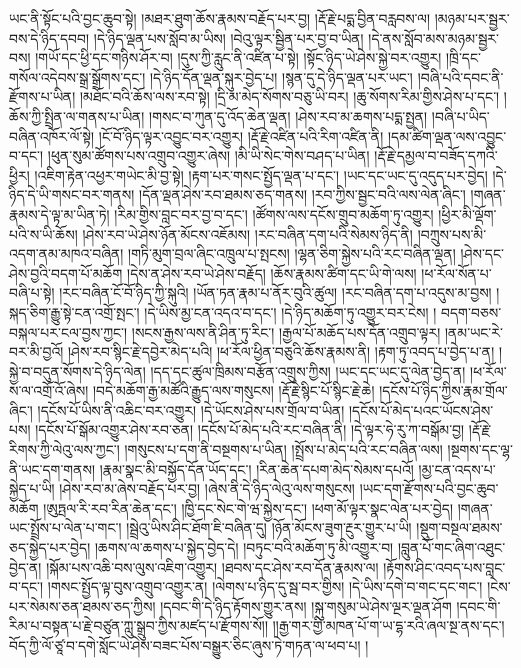 ཡང་ནི་སྟོང་པའི་བྱང་ཆུབ་སྟེ། །མཐར་ཐུག་ཆོས་རྣམས་བརྗོད་པར་བྱ། །རྡོ་རྗེ་པདྨ་བྱིན་བརླབས་ལ། །མཉམ་པར་སྦྱར་བས་དེ་ཉིད་དབབ། །དེ་ཉིད་ལྡན་པས་སློབ་མ་ཡིས། །བེའུ་ལྟར་སྦྱིན་པར་བྱ་བ་ཡིན། །དེ་ནས་སློབ་མས་མཉམ་སྦྱར་བས། །གཡོ་དང་ཕྱི་དང་གཉིས་ཤོར་བ། །དུས་ཀྱི་རླུང་ནི་འཛིན་པ་སྟེ། །སྟོང་ཉིད་ཡེ་ཤེས་སྐྱེ་བར་འགྱུར། །ཁྲི་དང་གསོལ་འདེབས་སྒྲ་སྒྲོགས་དང་། །དེ་ཉིད་དོན་ལྡན་སྐུར་བྱེད་པ། །སྙན་དུ་དེ་ཉིད་ལྡན་པར་ཡང་། །བཞི་པའི་དབང་ནི་རྫོགས་པ་ཡིན། །མཐོང་བའི་ཆོས་ལས་རབ་སྟེ། །དྲི་མ་མེད་སོགས་བཅུ་ཡི་བར། །ཆུ་སོགས་རིམ་གྱིས་ཤེས་པ་དང་། །ཆོས་ཀྱི་སྤྲིན་ལ་གནས་པ་ཡིན། །གསང་བ་ཀུན་དུ་འོད་ཆེན་ལྡན། །ཤེས་རབ་མ་ཆགས་པདྨ་སྤྱན། །བཞི་པ་ཡིད་བཞིན་འཁོར་ལོ་སྟེ། །ངོ་བོ་ཉིད་ལྟར་འབྱུང་བར་འགྱུར། །རྡོ་རྗེ་འཛིན་པའི་རིག་འཛིན་ནི། །དམ་ཚིག་ལྡན་ལས་འབྱུང་བ་དང་། །ཕུན་སུམ་ཚོགས་པས་འགྲུབ་འགྱུར་ཞེས། །མི་ཡི་སེང་གེས་བཤད་པ་ཡིན། །རྡོ་རྗེ་དམྱལ་བ་བཟོད་དཀའི་ཕྱིར། །འཇིག་རྟེན་འཕྱར་གཡེང་མི་བྱ་སྟེ། །རྟག་པར་གསང་སྤྱོད་ལྡན་པ་དང་། །ཡང་དང་ཡང་དུ་འདུད་པར་བྱེད། །དེ་ཉིད་དེ་ཡི་གསང་བར་གནས། །དོན་ལྡན་ཤེས་རབ་ཐམས་ཅད་གནས། །རབ་ཀྱིས་སྦྱང་བའི་ལས་ལེན་ཞིང་། །གཞན་རྣམས་དེ་ལྟ་མ་ཡིན་ཏེ། །རིམ་གྱིས་བླང་བར་བྱ་བ་དང་། །ཚོགས་ལས་དངོས་གྲུབ་མཆོག་ཏུ་འགྱུར། །ཕྱིར་མི་ལྡོག་པའི་ས་ཡི་ཆོས། །ཤེས་རབ་ཡེ་ཤེས་ཉོན་མོངས་འཇོམས། །རང་བཞིན་དག་པའི་སེམས་ཉིད་ནི། །བཀྲུས་པས་མི་འདག་ནམ་མཁའ་བཞིན། །གཏི་མུག་བྲལ་ཞིང་འཁྲུལ་པ་སྤངས། །ལྷན་ཅིག་སྐྱེས་པའི་རང་བཞིན་ལྡན། །ཤེས་དང་ཤེས་བྱའི་བདག་པོ་མཆོག །དེས་ན་ཤེས་རབ་ཡེ་ཤེས་བརྗོད། །ཆོས་རྣམས་ཚིག་དང་ཡི་གེ་ལས། །ཕ་རོལ་སོན་པ་བཞི་པ་སྟེ། །རང་བཞིན་ངོ་བོ་ཉིད་ཀྱི་སྐུའི། །ཡོན་ཏན་རྣམ་པ་ནོར་བུའི་ཚུལ། །རང་བཞིན་དག་པ་འདུས་མ་བྱས། །སྐད་ཅིག་རྒྱུ་སྟེ་ངན་འགྲོ་སྤང་། །དེ་ཡིས་མྱ་ངན་འདའ་བ་དང་། །དེ་ཉིད་མཆོག་ཏུ་འགྱུར་བར་ངེས། །
བདག་བཅས་བསྐལ་པར་ངལ་བྱས་ཀྱང་། །སངས་རྒྱས་ལས་ནི་ཤིན་ཏུ་རིང་། །རྒྱལ་པོ་མཆོད་པས་དོན་འགྲུབ་ལྟར། །ནམ་ཡང་རེ་བར་མི་བྱའོ། །ཤེས་རབ་སྙིང་རྗེ་དབྱེར་མེད་པའི། །ཕ་རོལ་ཕྱིན་བཅུའི་ཆོས་རྣམས་ནི། །རྟག་ཏུ་འབད་པ་བྱེད་པ་ན། །སྐྱེ་བ་བདུན་སོགས་དེ་ཉིད་ལེན། །དད་དང་ཚུལ་ཁྲིམས་བརྩོན་འགྲུས་ཀྱིས། །ཡང་དང་ཡང་དུ་ལེན་བྱེད་ན། །ཕ་རོལ་ས་ལ་འགྲོ་འོ་ཞེས། །བདེ་མཆོག་རྒྱ་མཚོའི་རྒྱུད་ལས་གསུངས། །རྡོ་རྗེ་སྙིང་པོ་སྙིང་རྗེ་ཆེ། །དངོས་པོ་ཉིད་ཀྱིས་རྣམ་གྲོལ་ཞིང་། །དངོས་པོ་ཡིས་ནི་འཆིང་བར་འགྱུར། །དེ་ཡོངས་ཤེས་པས་གྲོལ་བ་ཡིན། །དངོས་པོ་མེད་པའང་ཡོངས་ཤེས་པས། །དངོས་པོ་སྒོམ་འགྱུར་ཤེས་རབ་ཅན། །དངོས་པོ་མེད་པའི་རང་བཞིན་ནི། །དེ་ལྟར་ཧེ་རུ་ཀ་བསྒོམ་བྱ། །རྡོ་རྗེ་རིགས་ཀྱི་ལེའུ་ལས་ཀྱང་། །གསུངས་པ་དག་ནི་བསྔགས་པ་ཡིན། །སྤྲོས་པ་མེད་པའི་རང་བཞིན་ལས། །སྔགས་དང་ལྷ་ནི་ཡང་དག་གནས། །རྣམ་སྣང་མི་བསྐྱོད་དོན་ཡོད་དང་། །རིན་ཆེན་དཔག་མེད་སེམས་དཔའོ། །མྱ་ངན་འདས་པ་སྐྱེད་པ་ཡི། །ཤེས་རབ་མ་ཞེས་བརྗོད་པར་བྱ། །ཞེས་ནི་དེ་ཉིད་ལེའུ་ལས་གསུངས། །ཡང་དག་རྫོགས་པའི་བྱང་ཆུབ་མཆོག །ཨུཏྤལ་རི་རབ་རིན་ཆེན་དང་། །ཁྱི་དང་སེང་གེ་ཝ་སྐྱེས་དང་། །ཕག་མོ་ལྟར་སྣང་ལེན་པར་བྱེད། །གཞན་ཡང་སྤྲོས་པ་ལེན་པ་གང་། །སྦྲེའུ་ཡིས་ཤིང་ཐོག་ཇི་བཞིན་དུ། །ཉོན་མོངས་ཟུག་རྔུར་གྱུར་པ་ཡི། །སྡུག་བསྔལ་ཐམས་ཅད་སྐྱེད་པར་བྱེད། །ཆགས་ལ་ཆགས་པ་སྐྱེད་བྱེད་དེ། །བཏུང་བའི་མཆོག་ཏུ་མི་འགྱུར་བ། །བླུན་པོ་གང་ཞིག་འཐུང་བྱེད་ན། །སྐོམ་པས་འཆི་བས་ལུས་འཇིག་འགྱུར། །ཐབས་དང་ཤེས་རབ་དོན་རྣམས་ལ། །རྟོགས་ཤིང་འབད་པས་བླང་བ་དང་། །གསང་སྤྱོད་ལྟ་བུས་འགྲུབ་འགྱུར་ན། །ལེགས་པ་ཉིད་དུ་སྦ་བར་གྱིས། །དེ་ཡིས་དགེ་བ་གང་དང་གང་། །ངེས་པར་སེམས་ཅན་ཐམས་ཅད་ཀྱིས། །དབང་གི་དེ་ཉིད་རྟོགས་གྱུར་ནས། །སྐུ་གསུམ་ཡེ་ཤེས་ལྔར་ལྡན་ཤོག །དབང་གི་རིམ་པ་བསྟན་པ་རྗེ་བཙུན་ཀླུ་སྒྲུབ་ཀྱིས་མཛད་པ་རྫོགས་སོ།། །།རྒྱ་གར་གྱི་མཁན་པོ་ག་ཡ་དྷ་རའི་ཞལ་སྔ་ནས་དང་། བོད་ཀྱི་ལོ་ཙཱ་བ་དགེ་སློང་ཡེ་ཤེས་བཟང་པོས་བསྒྱུར་ཅིང་ཞུས་ཏེ་གཏན་ལ་ཕབ་པ། །